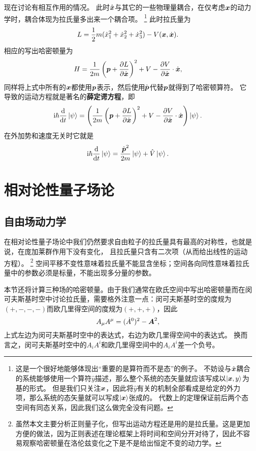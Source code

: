 \documentclass[hyperref, UTF8, a4paper]{ctexart}
\newcommand*{\ii}{\mathrm{i}}
\begin{document}
现在讨论有相互作用的情况。
此时$\hat{\vb*{x}}$与其它的一些物理量耦合，在仅考虑$\vb*{x}$的动力学时，耦合体现为拉氏量多出来一个耦合项。%
\footnote{这是一个很好地能够体现出“重要的是算符而不是态”的例子。
不妨设与$\hat{\vb*{x}}$耦合的系统能够使用一个算符$\hat{y}$描述，那么整个系统的态矢量就应该写成以$\ket{\vb*{x}, y}$为基的形式。
但是我们只关注$\vb*{x}$，因此将$\hat{y}$有关的机制全部看成是给定的外力项，那么系统的态矢量就可以写成$\ket{\vb*{x}}$张成的。
代数上的定理保证前后两个态空间有同态关系，因此我们这么做完全没有问题。
}
此时拉氏量为
\begin{equation}
    L = \frac{1}{2} m (\dot{x}_1^2 + \dot{x}_2^2 + \dot{x}_3^2) - V(\vb*{x}, \dot{\vb*{x}}).
\end{equation}
相应的写出哈密顿量为
\[
    H = \frac{1}{2m} \left(\vb*{p} + \pdv{L}{\dot{\vb*{x}}}\right)^2 + V - \pdv{V}{\dot{\vb*{x}}} \cdot \dot{\vb*{x}},
\]
同样将上式中所有的$\vb*{x}$都使用$\vb*{p}$表示，然后使用$\hat{\vb*{p}}$代替$\vb*{p}$就得到了哈密顿算符。
它导致的运动方程就是著名的\textbf{薛定谔方程}，即
\begin{equation}
    \ii \hbar \dv{t} \ket{\psi} = \left( \frac{1}{2m} \left(\vb*{p} + \pdv{L}{\dot{\vb*{x}}}\right)^2 + V - \pdv{V}{\dot{\vb*{x}}} \cdot \dot{\vb*{x}} \right) \ket{\psi}.
\end{equation}
在外加势和速度无关时它就是
\begin{equation}
    \ii \hbar \dv{t} \ket{\psi} = \frac{\hat{\vb*{p}}^2}{2m} \ket{\psi} + \hat{V} \ket{\psi}.
\end{equation}

\section{相对论性量子场论}

\subsection{自由场动力学}\label{sec:qft-free-dynamics}

在相对论性量子场论中我们仍然要求自由粒子的拉氏量具有最高的对称性，也就是说，在庞加莱群作用下没有变化，
且拉氏量只含有二次项（从而给出线性的运动方程）。%
\footnote{虽然本文主要分析正则量子化，但写出运动方程还是用的是拉氏量。这是更加方便的做法，因为正则表述在理论框架上将时间和空间分开对待了，因此不容易观察哈密顿量在洛伦兹变化之下是不是给出恒定不变的动力学。}
空间平移不变性意味着拉氏量不能显含坐标；空间各向同性意味着拉氏量中的参数必须是标量，不能出现多分量的参数。

本节还将计算三种场的哈密顿量。由于我们通常在欧氏空间中写出哈密顿量而在闵可夫斯基时空中讨论拉氏量，需要格外注意一点：闵可夫斯基时空的度规为$(+, -, -, -)$而欧几里得空间的度规为$(+, +, +)$，因此
\[
    A_\mu A^\mu = (\dot{A}^0)^2 - \vb*{A}^2,
\]
上式左边为闵可夫斯基时空中的表达式，右边为欧几里得空间中的表达式。
换而言之，闵可夫斯基时空中的$A_i A^i$和欧几里得空间中的$A_i A^i$差一个负号。
\end{document}
